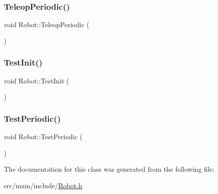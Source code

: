 \mbox{\label{classRobot_a324322627c63b3870daf7c7ddc5bea63}} 
\subsubsection{\texorpdfstring{Teleop\+Periodic()}{TeleopPeriodic()}}
{\footnotesize\ttfamily void Robot\+::\+Teleop\+Periodic (\begin{DoxyParamCaption}{ }\end{DoxyParamCaption})\hspace{0.3cm}{\ttfamily [override]}}

\mbox{\label{classRobot_a9ac222d45d30a6d0c572fd36d18c6ccc}} 
\subsubsection{\texorpdfstring{Test\+Init()}{TestInit()}}
{\footnotesize\ttfamily void Robot\+::\+Test\+Init (\begin{DoxyParamCaption}{ }\end{DoxyParamCaption})\hspace{0.3cm}{\ttfamily [override]}}

\mbox{\label{classRobot_af0ac44a962e609e9b042285e699d1db8}} 
\subsubsection{\texorpdfstring{Test\+Periodic()}{TestPeriodic()}}
{\footnotesize\ttfamily void Robot\+::\+Test\+Periodic (\begin{DoxyParamCaption}{ }\end{DoxyParamCaption})\hspace{0.3cm}{\ttfamily [override]}}



The documentation for this class was generated from the following file\+:\begin{DoxyCompactItemize}
\item 
src/main/include/\hyperlink{Robot_8h}{Robot.\+h}\end{DoxyCompactItemize}
